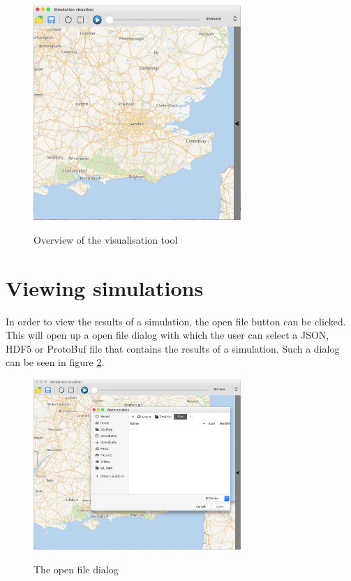 \begin{figure}[H]
\centering
\includegraphics[width=0.7\textwidth,keepaspectratio]{images/overview.png}
\label{fig:screenshot_overview}
\caption{Overview of the visualisation tool}
\end{figure}

\section{Viewing simulations}
\label{section:viewing}

In order to view the results of a simulation, the open file button can be clicked. This will open up a open file dialog with which the user can select a JSON, HDF5 or ProtoBuf file that contains the results of a simulation. Such a dialog can be seen in figure \ref{fig:screenshot_openFile}.

\begin{figure}[H]
\centering
\includegraphics[width=0.7\textwidth,keepaspectratio]{images/open_file.png}
\label{fig:screenshot_openFile}
\caption{The open file dialog}
\end{figure}

